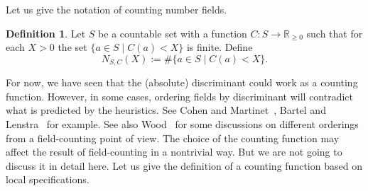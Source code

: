 \documentclass[12pt,a4paper]{amsart}
\numberwithin{equation}{section}%
\theoremstyle{plain}%
\theoremstyle{definition}%
\newtheorem{definition}[theorem]{Definition}%
\theoremstyle{remark}%
\begin{document}
	Let us give the notation of counting number fields.
	\begin{definition}\label{def: counting number fields}
		Let $S$ be a countable set with a function $C:S\to\mathbb{R}_{\geq0}$ such that for each $X>0$ the set $\{a\in S\mid C(a)<X\}$ is finite.
		Define
		\begin{equation*}
			N_{S,C}(X):=\#\{a\in S\mid C(a)<X\}.
		\end{equation*}
	\end{definition}
	For now, we have seen that the (absolute) discriminant could work as a counting function.
	However, in some cases, ordering fields by discriminant will contradict what is predicted by the heuristics.
	See Cohen and Martinet~\cite{Cohen1994HeuristicsOC}, Bartel and Lenstra~\cite{bartel2020class} for example.
	See also Wood~\cite{wood2010probabilities} for some discussions on different orderings from a field-counting point of view.
	The choice of the counting function may affect the result of field-counting in a nontrivial way.
	But we are not going to discuss it in detail here.
	Let us give the definition of a counting function based on local specifications.
\end{document}
